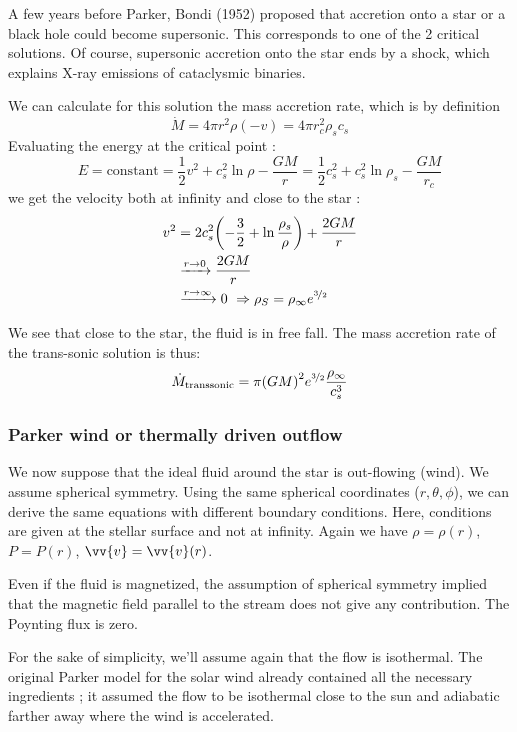 \documentclass[10pt,a4paper,english]{article}
\let\originalleft\left
\let\originalright\right
\renewcommand{\left}{\mathopen{}\mathclose\bgroup\originalleft}
\renewcommand{\right}{\aftergroup\egroup\originalright}
\begin{document}
A few years before Parker, Bondi (1952) proposed that accretion onto a star or a black hole could become supersonic. This corresponds to one of the 2 critical solutions. Of course, supersonic accretion onto the star ends by a shock, which explains X-ray emissions of cataclysmic binaries.

We can calculate for this solution the mass accretion rate, which is by definition
\begin{equation}
    \dot{M} = 4\pi r^2 \rho (-v) = 4\pi r_c^2 \rho_s c_s
\end{equation}
Evaluating the energy at the critical point :
\begin{equation}
    E = \textrm{constant} = \frac{1}{2}v^2 + c_s^2 \ln\rho - \frac{GM}{r} = \frac{1}{2}c_s^2 + c_s^2 \ln \rho_s - \frac{GM}{r_c}
\end{equation}
we get the velocity both at infinity and close to the star :
\begin{align}
    v^2 &= 2c_s^2 \left( -\frac{3}{2} + \ln \frac{\rho_s}{\rho} \right)  + \frac{2GM}{r} \\
        & \xrightarrow{r\to 0} \frac{2GM}{r} \\
        & \xrightarrow{r\to\infty} 0\ \Rightarrow \rho_S = \rho_\infty e^{\nicefrac{3}{2}}
\end{align}

We see that close to the star, the fluid is in free fall. The mass accretion rate of the trans-sonic solution is thus:
\begin{equation}
    \dot{M}_\mathrm{transsonic} = \pi \left( GM \right)^2 e^{\nicefrac{3}{2}} \frac{\rho_\infty}{c_s^3}
\end{equation}
\subsubsection{Parker wind or thermally driven outflow}
We now suppose that the ideal fluid around the star is out-flowing (wind). We assume spherical symmetry. Using the same spherical coordinates ($r, \theta, \phi$), we can derive the same equations with different boundary conditions. Here, conditions are given at the stellar surface and not at infinity. Again we have $\rho = \rho(r)$, $P = P(r)$, $\vv{v} = \vv{v}(r)$.

Even if the fluid is magnetized, the assumption of spherical symmetry implied that the magnetic field parallel to the stream does not give any contribution. The Poynting flux is zero.

For the sake of simplicity, we'll assume again that the flow is isothermal. The original Parker model for the solar wind already contained all the necessary ingredients ; it assumed the flow to be isothermal close to the sun and adiabatic farther away where the wind is accelerated.
\end{document}
